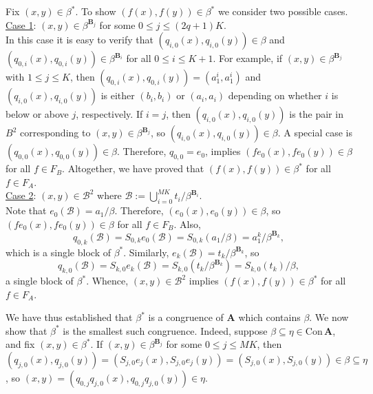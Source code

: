 \documentclass[cm,dissertation,actual,final]{uhthesis}
\theoremstyle{plain}
\theoremstyle{definition}
\theoremstyle{remark}
\numberwithin{theorem}{section}
\numberwithin{claim}{chapter}
\numberwithin{equation}{section}
\numberwithin{conjecture}{chapter}
\newcommand{\<}{\ensuremath{\langle}}
\renewcommand{\>}{\ensuremath{\rangle}}
\renewcommand{\leq}{\ensuremath{\leqslant}}
\newcommand{\Con}{\ensuremath{\mathrm{Con\,}}}
\newcommand{\0}{\ensuremath{\mathbf{0}}}
\newcommand{\1}{\ensuremath{\mathbf{1}}}
\newcommand{\2}{\ensuremath{\mathbf{2}}}
\newcommand{\3}{\ensuremath{\mathbf{3}}}
\newcommand{\4}{\ensuremath{\mathbf{4}}}
\newcommand{\5}{\ensuremath{\mathbf{5}}}
\newcommand{\bA}{\ensuremath{\mathbf{A}}}
\newcommand{\bB}{\ensuremath{\mathbf{B}}}
\newcommand{\sB}{\ensuremath{\mathscr{B}}}
\begin{document}
Fix $(x,y) \in \beta^*$.  To show $(f(x), f(y)) \in \beta^*$ we consider two
possible cases.
\\[6pt]
\underline{Case 1}: $(x,y)\in \beta^{\bB_j}$ for some $0\leq j \leq (2q+1)K$.\\[4pt]
In this case it is easy to verify that $(q_{i,0}(x), q_{i,0}(y)) \in \beta$ and 
$(q_{0,i}(x), q_{0,i}(y)) \in \beta^{\bB_i}$  for all $0\leq i \leq
K+1$.  For example, if $(x,y)\in \beta^{\bB_j}$ with $1\leq j \leq K$, 
then $(q_{0,i}(x), q_{0,i}(y))  = (a_1^i, a_1^i)$ %
and $(q_{i,0}(x), q_{i,0}(y))$ is either $(b_i, b_i)$ or $(a_i,
a_i)$ depending on whether $i$ is below or above $j$, respectively. If $i=j$,
then $(q_{i,0}(x), q_{i,0}(y))$ is the pair in $B^2$ corresponding to
$(x,y)\in \beta^{\bB_j}$, so $(q_{i,0}(x), q_{i,0}(y))\in \beta$.
A special case is $(q_{0,0}(x), q_{0,0}(y)) \in \beta$.  Therefore,
$q_{0,0} = e_0$, implies $(f e_{0}(x), f e_{0}(y))\in \beta$
for all $f\in F_B$.
Altogether, we have proved that $(f(x),f(y))\in \beta^*$
for all $f\in F_A$.
\\[6pt]
\underline{Case 2}: $(x,y)\in \sB^2$ where $\sB := \bigcup_{i=0}^{MK}t_i/\beta^{\bB_i}$.
\\[4pt]
Note that  $e_0(\sB) = a_1/\beta$. Therefore, 
$(e_0(x),e_0(y)) \in  \beta$, so 
$(fe_0(x),fe_0(y)) \in  \beta$ for all $f\in F_B$.  Also,
\[
q_{0,k}(\sB) = S_{0,k} e_0(\sB) = S_{0,k}(a_1/\beta) = 
a_1^{k}/\beta^{\bB_{k}},
\]
which is a single block of $\beta^*$.
Similarly,
$e_k(\sB) = t_k/\beta^{\bB_k}$, so 
\[
q_{k,0}(\sB) = S_{k,0} e_k(\sB) = S_{k,0}(t_k/\beta^{\bB_k}) = S_{k,0}(t_k)/\beta,
\]
a single block of $\beta^*$.
Whence, $(x,y)\in \sB^2$ implies $(f(x), f(y)) \in \beta^*$ for all $f\in F_A$.

We have thus established that $\beta^*$ is a congruence of $\bA$ which
contains $\beta$.  We now show that $\beta^*$ is the smallest such congruence.  Indeed,
suppose $\beta \subseteq \eta \in \Con\bA$, and fix $(x,y)\in \beta^*$.
If $(x,y)\in \beta^{\bB_j}$ for some $0\leq j \leq MK$, then 
$(q_{j,0}(x), q_{j,0}(y)) = (S_{j,0}e_j(x), S_{j,0}e_j(y))= (S_{j,0}(x), S_{j,0}(y))\in \beta \subseteq \eta$, so 
$(x, y) = (q_{0,j}q_{j,0}(x), q_{0,j}q_{j,0}(y))\in \eta$.
\end{document}
